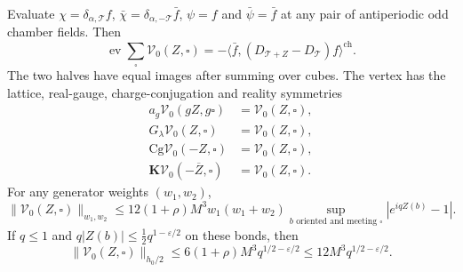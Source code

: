 \documentclass[11pt,letterpaper,reqno]{amsart}
\begin{document}
\begin{proposition}\label{prop:rg-step-first-vertex}
Evaluate $\chi=\delta_{\alpha,\mathscr T}f$,
$\bar\chi=\delta_{\alpha,-\mathscr T}\bar f$,
$\psi=f$ and $\bar\psi=\bar f$ at any pair of
antiperiodic odd chamber fields. Then
\begin{equation}\label{eq:rg-step-first-vertex-evaluation}
 \operatorname{ev}\sum_\square\mathcal V_0(Z,\square)
          =-\langle\bar f,(D_{\mathscr T+Z}-D_{\mathscr T})
                                                    f\rangle^{\mathrm{ch}}.
\end{equation}
The two halves have equal images after summing
over cubes. The vertex has the lattice, real-gauge,
charge-conjugation and reality symmetries
\begin{equation}\label{eq:rg-step-first-vertex-symmetries}
 \begin{split}
 a_g\mathcal V_0(gZ,g\square)&=\mathcal V_0(Z,\square),\\
 G_\lambda\mathcal V_0(Z,\square)&=\mathcal V_0(Z,\square),\\
 \mathrm{Cg}\mathcal V_0(-Z,\square)&=\mathcal V_0(Z,\square),\\
 \mathbf K\mathcal V_0(-\overline Z,\square)&=\mathcal V_0(Z,\square).
 \end{split}
\end{equation}
For any generator weights $(w_1,w_2)$,
\begin{equation}\label{eq:rg-step-first-vertex-bound}
 \|\mathcal V_0(Z,\square)\|_{w_1,w_2}
       \le12(1+\rho)M^3w_1(w_1+w_2)
       \sup_{b\text{ oriented and meeting }\square}
                                                      |e^{iqZ(b)}-1|.
\end{equation}
If $q\le1$ and
$q|Z(b)|\le\frac12q^{1-\varepsilon/2}$ on these bonds,
then
\begin{equation}\label{eq:rg-step-first-vertex-small-bound}
 \|\mathcal V_0(Z,\square)\|_{h_0/2}
                 \le6(1+\rho)M^3q^{1/2-\varepsilon/2}
                 \le12M^3q^{1/2-\varepsilon/2}.
\end{equation}
\end{proposition}
\end{document}
